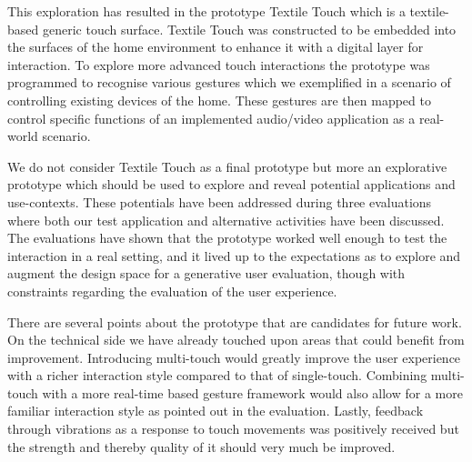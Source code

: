 This exploration has resulted in the prototype Textile Touch which is a textile-based generic touch surface.
Textile Touch was constructed to be embedded into the surfaces of the home environment to enhance it with a digital layer for interaction.
To explore more advanced touch interactions the prototype was programmed to recognise various gestures which we exemplified in a scenario of controlling existing devices of the home.
These gestures are then mapped to control specific functions of an implemented audio/video application as a real-world scenario.

We do not consider Textile Touch as a final prototype but more an explorative prototype which should be used to explore and reveal potential applications and use-contexts.
These potentials have been addressed during three evaluations where both our test application and alternative activities have been discussed.
The evaluations have shown that the prototype worked well enough to test the interaction in a real setting, and it lived up to the expectations as to explore and augment the design space for a generative user evaluation, though with constraints regarding the evaluation of the user experience. 

There are several points about the prototype that are candidates for future work.
On the technical side we have already touched upon areas that could benefit from improvement.
Introducing multi-touch would greatly improve the user experience with a richer interaction style compared to that of single-touch.
Combining multi-touch with a more real-time based gesture framework would also allow for a more familiar interaction style as pointed out in the evaluation.
Lastly, feedback through vibrations as a response to touch movements was positively received but the strength and thereby quality of it should very much be improved.